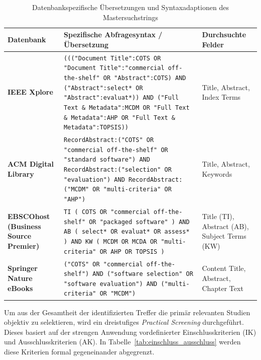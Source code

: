 \begin{table}[htbp]
\centering
\small
\caption{Datenbankspezifische Übersetzungen und Syntaxadaptionen des Mastersuchstrings}
\label{tab:datenbanken_syntax}
\begin{tabularx}{\textwidth}{p{3.2cm} X p{2.8cm}}
\toprule
\textbf{Datenbank} & \textbf{Spezifische Abfragesyntax / Übersetzung} & \textbf{Durchsuchte Felder} \\
\midrule
\textbf{IEEE Xplore} & \texttt{((("Document Title":COTS OR "Document Title":"commercial off-the-shelf" OR "Abstract":COTS) AND ("Abstract":select* OR "Abstract":evaluat*)) AND ("Full Text \& Metadata":MCDM OR "Full Text \& Metadata":AHP OR "Full Text \& Metadata":TOPSIS))} & Title, Abstract, Index Terms \\
\midrule
\textbf{ACM Digital Library} & \texttt{RecordAbstract:("COTS" OR "commercial off-the-shelf" OR "standard software") AND RecordAbstract:("selection" OR "evaluation") AND RecordAbstract:("MCDM" OR "multi-criteria" OR "AHP")} & Title, Abstract, Keywords \\
\midrule
\textbf{EBSCOhost (Business Source Premier)} & \texttt{TI ( COTS OR "commercial off-the-shelf" OR "packaged software" ) AND AB ( select* OR evaluat* OR assess* ) AND KW ( MCDM OR MCDA OR "multi-criteria" OR AHP OR TOPSIS )} & Title (TI), Abstract (AB), Subject Terms (KW) \\
\midrule
\textbf{Springer Nature eBooks} & \texttt{("COTS" OR "commercial off-the-shelf") AND ("software selection" OR "software evaluation") AND ("multi-criteria" OR "MCDM")} & Content Title, Abstract, Chapter Text \\
\bottomrule
\end{tabularx}
\end{table}

Um aus der Gesamtheit der identifizierten Treffer die primär relevanten Studien objektiv zu selektieren, wird ein dreistufiges \textit{Practical Screening} durchgeführt. Dieses basiert auf der strengen Anwendung vordefinierter Einschlusskriterien (IK) und Ausschlusskriterien (AK). In Tabelle~\ref{tab:einschluss_ausschluss} werden diese Kriterien formal gegeneinander abgegrenzt.


